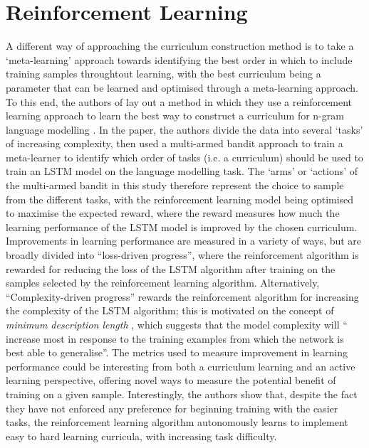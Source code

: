 \section{Reinforcement Learning}
A different way of approaching the curriculum construction method is to take a `meta-learning' \cite{vilalta2002perspective} approach towards identifying the best order in which to include training samples throughtout learning, with the best curriculum being a parameter that can be learned and optimised through a meta-learning approach. To this end, the authors of \cite{graves2017automated} lay out a method in which they use a reinforcement learning \cite{sutton1998introduction} approach to learn the best way to construct a curriculum for n-gram language modelling \cite{kneser1995improved}. In the paper, the authors divide the data into several `tasks' of increasing complexity, then used a multi-armed bandit approach \cite{sutton1998introduction} to train a meta-learner to identify which order of tasks (i.e. a curriculum) should be used to train an LSTM model on the language modelling task. The `arms' or `actions' of the multi-armed bandit in this study therefore represent the choice to sample from the different tasks, with the reinforcement learning model being optimised to maximise the expected reward, where the reward measures how much the learning performance of the LSTM model is improved by the chosen curriculum. Improvements in learning performance are measured in a variety of ways, but are broadly divided into ``loss-driven progress'', where the reinforcement algorithm is rewarded for reducing the loss of the LSTM algorithm after training on the samples selected by the reinforcement learning algorithm. Alternatively, ``Complexity-driven progress'' rewards the reinforcement algorithm for increasing the complexity of the LSTM algorithm; this is motivated on the concept of \textit{minimum description length} \cite{grunwaldminimum}, which suggests that the model complexity will `` increase most in response to the training examples from which the network is best able to generalise''. The metrics used to measure improvement in learning performance could be interesting from both a curriculum learning and an active learning perspective, offering novel ways to measure the potential benefit of training on a given sample. Interestingly, the authors show that, despite the fact they have not enforced any preference for beginning training with the easier tasks, the reinforcement learning algorithm autonomously learns to implement easy to hard learning curricula, with increasing task difficulty. 

